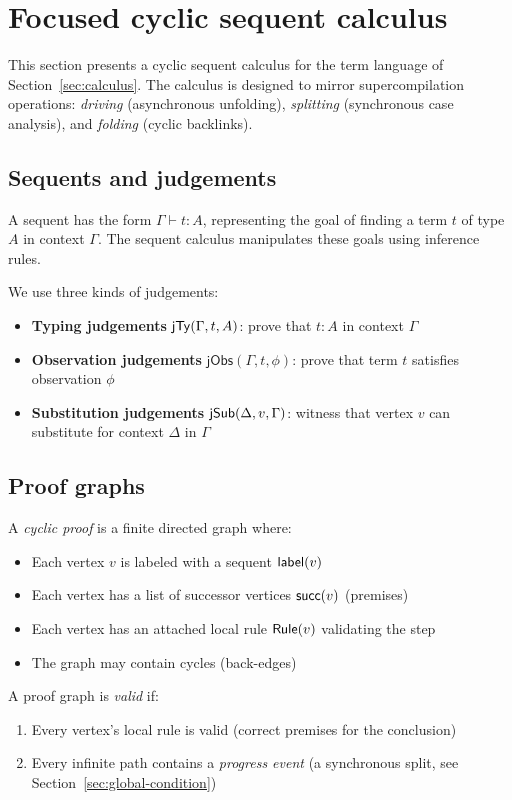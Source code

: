 \section{Focused cyclic sequent calculus}
\label{sec:focused}

This section presents a cyclic sequent calculus for the term language of Section~\ref{sec:calculus}. The calculus is designed to mirror supercompilation operations: \emph{driving} (asynchronous unfolding), \emph{splitting} (synchronous case analysis), and \emph{folding} (cyclic backlinks).

\subsection{Sequents and judgements}

A sequent has the form $\Gamma \vdash t : A$, representing the goal of finding a term $t$ of type $A$ in context $\Gamma$. The sequent calculus manipulates these goals using inference rules.

We use three kinds of judgements:
\begin{itemize}
\item \textbf{Typing judgements} $\mathsf{jTy}(\Gamma, t, A)$: prove that $t : A$ in context $\Gamma$
\item \textbf{Observation judgements} $\mathsf{jObs}(\Gamma, t, \phi)$: prove that term $t$ satisfies observation $\phi$
\item \textbf{Substitution judgements} $\mathsf{jSub}(\Delta, v, \Gamma)$: witness that vertex $v$ can substitute for context $\Delta$ in $\Gamma$
\end{itemize}

\subsection{Proof graphs}

A \emph{cyclic proof} is a finite directed graph where:
\begin{itemize}
\item Each vertex $v$ is labeled with a sequent $\mathsf{label}(v)$
\item Each vertex has a list of successor vertices $\mathsf{succ}(v)$ (premises)
\item Each vertex has an attached local rule $\mathsf{Rule}(v)$ validating the step
\item The graph may contain cycles (back-edges)
\end{itemize}

\noindent A proof graph is \emph{valid} if:
\begin{enumerate}
\item Every vertex's local rule is valid (correct premises for the conclusion)
\item Every infinite path contains a \emph{progress event} (a synchronous split, see Section~\ref{sec:global-condition})
\end{enumerate}

